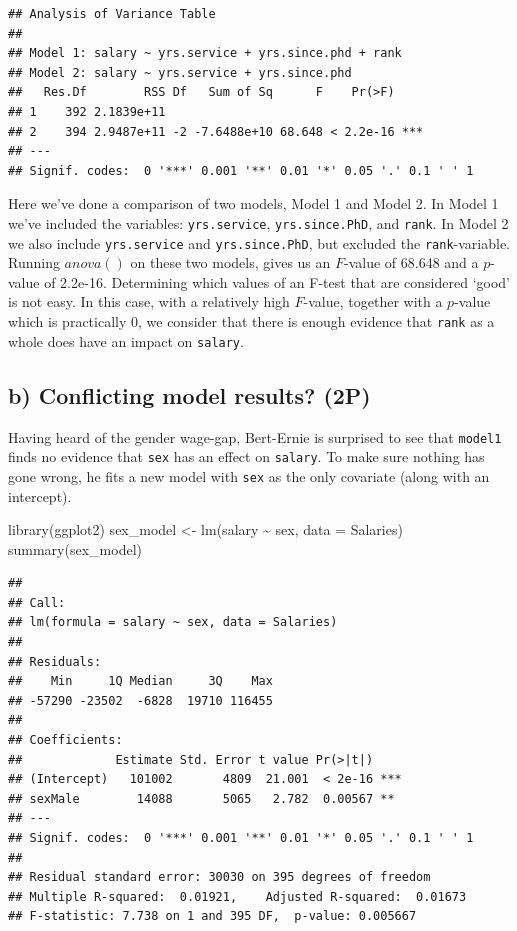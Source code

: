\documentclass[
]{article}
\newenvironment{Shaded}{\begin{snugshade}}{\end{snugshade}}
\newcommand{\AttributeTok}[1]{\textcolor[rgb]{0.77,0.63,0.00}{#1}}
\newcommand{\FunctionTok}[1]{\textcolor[rgb]{0.00,0.00,0.00}{#1}}
\newcommand{\NormalTok}[1]{#1}
\newcommand{\OtherTok}[1]{\textcolor[rgb]{0.56,0.35,0.01}{#1}}
\newcommand{\SpecialCharTok}[1]{\textcolor[rgb]{0.00,0.00,0.00}{#1}}
\begin{document}
\begin{verbatim}
## Analysis of Variance Table
## 
## Model 1: salary ~ yrs.service + yrs.since.phd + rank
## Model 2: salary ~ yrs.service + yrs.since.phd
##   Res.Df        RSS Df   Sum of Sq      F    Pr(>F)    
## 1    392 2.1839e+11                                    
## 2    394 2.9487e+11 -2 -7.6488e+10 68.648 < 2.2e-16 ***
## ---
## Signif. codes:  0 '***' 0.001 '**' 0.01 '*' 0.05 '.' 0.1 ' ' 1
\end{verbatim}

Here we've done a comparison of two models, Model 1 and Model 2. In
Model 1 we've included the variables: \texttt{yrs.service},
\texttt{yrs.since.PhD}, and \texttt{rank}. In Model 2 we also include
\texttt{yrs.service} and \texttt{yrs.since.PhD}, but excluded the
\texttt{rank}-variable. Running \(anova()\) on these two models, gives
us an \(F\)-value of 68.648 and a \(p\)-value of 2.2e-16. Determining
which values of an F-test that are considered `good' is not easy. In
this case, with a relatively high \(F\)-value, together with a
\(p\)-value which is practically 0, we consider that there is enough
evidence that \texttt{rank} as a whole does have an impact on
\texttt{salary}.

\hypertarget{b-conflicting-model-results-2p}{%
\subsection{b) Conflicting model results?
(2P)}\label{b-conflicting-model-results-2p}}

Having heard of the gender wage-gap, Bert-Ernie is surprised to see that
\texttt{model1} finds no evidence that \texttt{sex} has an effect on
\texttt{salary}. To make sure nothing has gone wrong, he fits a new
model with \texttt{sex} as the only covariate (along with an intercept).

\begin{Shaded}
\begin{Highlighting}[]
\FunctionTok{library}\NormalTok{(ggplot2)}
\NormalTok{sex\_model }\OtherTok{\textless{}{-}} \FunctionTok{lm}\NormalTok{(salary }\SpecialCharTok{\textasciitilde{}}\NormalTok{ sex, }\AttributeTok{data =}\NormalTok{ Salaries)}
\FunctionTok{summary}\NormalTok{(sex\_model)}
\end{Highlighting}
\end{Shaded}

\begin{verbatim}
## 
## Call:
## lm(formula = salary ~ sex, data = Salaries)
## 
## Residuals:
##    Min     1Q Median     3Q    Max 
## -57290 -23502  -6828  19710 116455 
## 
## Coefficients:
##             Estimate Std. Error t value Pr(>|t|)    
## (Intercept)   101002       4809  21.001  < 2e-16 ***
## sexMale        14088       5065   2.782  0.00567 ** 
## ---
## Signif. codes:  0 '***' 0.001 '**' 0.01 '*' 0.05 '.' 0.1 ' ' 1
## 
## Residual standard error: 30030 on 395 degrees of freedom
## Multiple R-squared:  0.01921,    Adjusted R-squared:  0.01673 
## F-statistic: 7.738 on 1 and 395 DF,  p-value: 0.005667
\end{verbatim}
\end{document}
